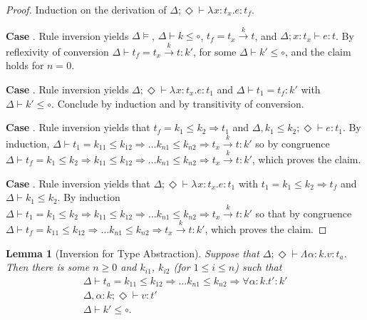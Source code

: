 \documentclass{article}
\newcommand{\ONE}{\circ}
\newcommand{\TASS}[1]{#1\colon\!}
\newcommand{\TVAR}{\alpha}
\newcommand{\TALL}[2]{\forall\TASS{#1}#2.}
\newcommand{\LAM}[3][{}]{\lambda^{#1}\TASS{#2}#3.}
\newcommand{\TLAM}[3][{}]{\Lambda^{#1}\TASS{#2}#3.}
\newcommand{\KENV}{\Delta}
\newcommand{\TENVEMPTY}{\Diamond}
\newtheorem{lemma}{Lemma}
\begin{document}
\begin{proof}
  Induction on the derivation of
  $\KENV; \TENVEMPTY \vdash \LAM x {t_x} e : t_f$.

  \textbf{Case} . Rule inversion yields $\KENV \models$,
  $\KENV \vdash k \le \ONE$, $t_f = t_x \stackrel{k}\to t$, and
  $\KENV; \TASS x{t_x} \vdash e : t$. By reflexivity of conversion
  $\KENV \vdash t_f = t_x \stackrel{k}\to t : k'$, for some
  $\KENV \vdash k' \le \ONE$, and the claim holds for $n=0$.

  \textbf{Case} . Rule inversion yields
  $\KENV; \TENVEMPTY \vdash \LAM x {t_x} e : t_1$ and
  $\KENV \vdash t_1 = t_f : k'$ with $\KENV \vdash k' \le
  \ONE$. Conclude by induction and by transitivity of conversion.

  \textbf{Case} . Rule inversion yields that
  $t_f = k_1 \le k_2 \Rightarrow t_1$ and
  $\KENV, k_1 \le k_2; \TENVEMPTY \vdash e : t_1$. By induction,
  $\KENV \vdash t_1 = k_{11}\le k_{12}\Rightarrow \dots k_{n1}\le
  k_{n2} \Rightarrow t_x \stackrel{k}\to t : k'$ so by congruence
  $\KENV \vdash t_f = k_1 \le k_2 \Rightarrow k_{11}\le k_{12}\Rightarrow \dots k_{n1}\le
  k_{n2} \Rightarrow t_x \stackrel{k}\to t : k'$, which proves the claim.

  \textbf{Case} . Rule inversion yields that
  $\KENV; \TENVEMPTY \vdash \LAM x {t_x} e : t_1$ with
  $t_1 = k_1 \le k_2 \Rightarrow t_f$ and $\KENV \vdash k_1 \le
  k_2$. By induction
  $\KENV \vdash t_1 = k_1 \le k_2 \Rightarrow k_{11}\le
  k_{12}\Rightarrow \dots k_{n1}\le k_{n2} \Rightarrow t_x
  \stackrel{k}\to t : k'$ so that by congruence
  $\KENV \vdash t_f = k_{11}\le
  k_{12}\Rightarrow \dots k_{n1}\le k_{n2} \Rightarrow t_x
  \stackrel{k}\to t : k'$, which proves the claim.
\end{proof}
\begin{lemma}[Inversion for Type Abstraction]\label{lemma:inversion-universal}
  Suppose that $\KENV; \TENVEMPTY \vdash \TLAM\TVAR k v : t_a$.
  Then there is some $n\ge0$ and $k_{i1}$, $k_{i2}$ (for $1\le i\le n$) such that 
  \begin{gather}
    \KENV \vdash t_a = k_{11}\le k_{12}\Rightarrow \dots k_{n1}\le k_{n2} \Rightarrow \TALL \TVAR k t' : k'
    \\
    \KENV, \TASS \TVAR{k}; \TENVEMPTY \vdash v : t'
    \\
    \KENV \vdash k' \le \ONE
    \mathrm{.}
  \end{gather}
\end{lemma}
\end{document}
